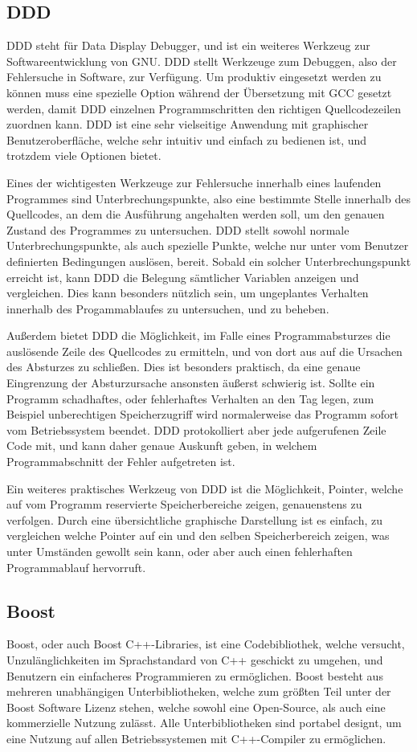 \subsection{DDD}
DDD steht für Data Display Debugger, und ist ein weiteres Werkzeug zur Softwareentwicklung von GNU. DDD stellt Werkzeuge zum Debuggen, also der Fehlersuche in Software, zur Verfügung. Um produktiv eingesetzt
werden zu können muss eine spezielle Option während der Übersetzung mit GCC gesetzt werden, damit DDD einzelnen Programmschritten den richtigen Quellcodezeilen zuordnen kann. DDD ist eine sehr vielseitige
Anwendung mit graphischer Benutzeroberfläche, welche sehr intuitiv und einfach zu bedienen ist, und trotzdem viele Optionen bietet.

Eines der wichtigesten Werkzeuge zur Fehlersuche innerhalb eines laufenden Programmes sind Unterbrechungspunkte, also eine bestimmte Stelle innerhalb des Quellcodes, an dem die Ausführung angehalten werden 
soll, um den genauen Zustand des Programmes zu untersuchen. DDD stellt sowohl normale Unterbrechungspunkte, als auch spezielle Punkte, welche nur unter vom Benutzer definierten Bedingungen auslösen, bereit.
Sobald ein solcher Unterbrechungspunkt erreicht ist, kann DDD die Belegung sämtlicher Variablen anzeigen und vergleichen. Dies kann besonders nützlich sein, um ungeplantes Verhalten innerhalb des
Progamm\-ablaufes zu untersuchen, und zu beheben. 

Außerdem bietet DDD die Möglichkeit, im Falle eines Programmabsturzes die auslösende Zeile des Quellcodes zu ermitteln, und von dort aus auf die Ursachen des Absturzes zu schließen. Dies ist besonders
praktisch, da eine genaue Eingrenzung der Absturzursache ansonsten äußerst schwierig ist. Sollte ein Programm schadhaftes, oder fehlerhaftes Verhalten an den Tag legen, zum Beispiel unberechtigen Speicherzugriff
wird normalerweise das Programm sofort vom Betriebssystem beendet. DDD protokolliert aber jede aufgerufenen Zeile Code mit, und kann daher genaue Auskunft geben, in welchem Programmabschnitt der
Fehler aufgetreten ist.

Ein weiteres praktisches Werkzeug von DDD ist die Möglichkeit, Pointer, welche auf vom Programm reservierte Speicherbereiche zeigen, genauenstens zu verfolgen. Durch eine übersichtliche graphische Darstellung
ist es einfach, zu vergleichen welche Pointer auf ein und den selben Speicherbereich zeigen, was unter Umständen gewollt sein kann, oder aber auch einen fehlerhaften Programmablauf hervorruft.

\subsection{Boost}
Boost, oder auch Boost C++-Libraries, ist eine Codebibliothek, welche versucht, Un\-zu\-läng\-lich\-keiten im Sprachstandard von C++ geschickt zu umgehen, und Benutzern ein einfacheres Programmieren zu ermöglichen.
Boost besteht aus mehreren unabhängigen Unterbibliotheken, welche zum größten Teil unter der Boost Software Lizenz stehen, welche sowohl eine Open-Source, als auch eine kommerzielle Nutzung zulässt. Alle
Unterbibliotheken sind portabel designt, um eine Nutzung auf allen Betriebssystemen mit C++-Compiler zu ermöglichen. 

